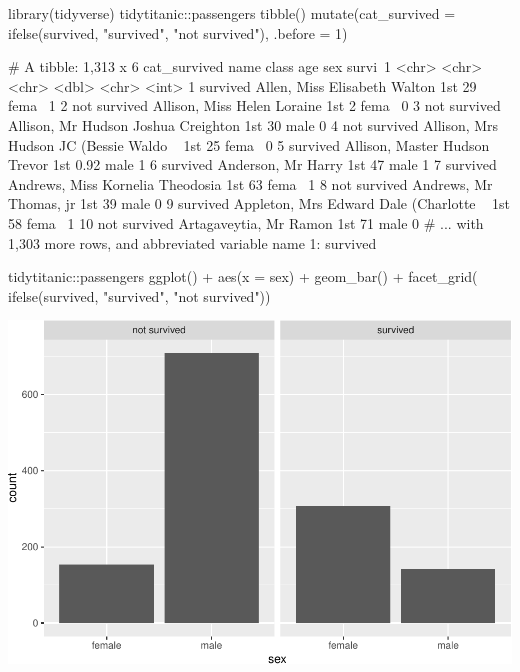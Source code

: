 \begin{Schunk}
\begin{Sinput}
library(tidyverse)
tidytitanic::passengers %
  tibble() %
  mutate(cat_survived = ifelse(survived, 
                               "survived", 
                               "not survived"), 
         .before = 1)
\end{Sinput}
\begin{Soutput}
     # A tibble: 1,313 x 6
        cat_survived name                                   class   age sex   survi~1
        <chr>        <chr>                                  <chr> <dbl> <chr>   <int>
      1 survived     Allen, Miss Elisabeth Walton           1st   29    fema~       1
      2 not survived Allison, Miss Helen Loraine            1st    2    fema~       0
      3 not survived Allison, Mr Hudson Joshua Creighton    1st   30    male        0
      4 not survived Allison, Mrs Hudson JC (Bessie Waldo ~ 1st   25    fema~       0
      5 survived     Allison, Master Hudson Trevor          1st    0.92 male        1
      6 survived     Anderson, Mr Harry                     1st   47    male        1
      7 survived     Andrews, Miss Kornelia Theodosia       1st   63    fema~       1
      8 not survived Andrews, Mr Thomas, jr                 1st   39    male        0
      9 survived     Appleton, Mrs Edward Dale (Charlotte ~ 1st   58    fema~       1
     10 not survived Artagaveytia, Mr Ramon                 1st   71    male        0
     # ... with 1,303 more rows, and abbreviated variable name 1: survived
\end{Soutput}
\end{Schunk}

\begin{Schunk}
\begin{Sinput}
tidytitanic::passengers %
ggplot() + 
  aes(x = sex) + 
  geom_bar() + 
  facet_grid(~ ifelse(survived, 
                      "survived", 
                      "not survived")) 
\end{Sinput}

\includegraphics[width=0.69\linewidth]{r_journal_files/figure-latex/visual_status_quo-1} \end{Schunk}

